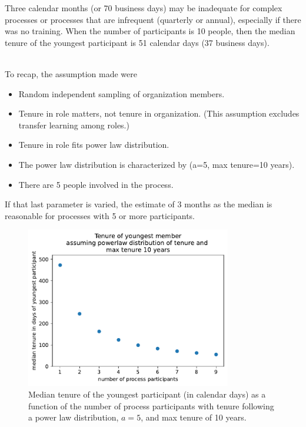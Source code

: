 Three calendar months (or 70 business days) may be inadequate for complex processes or processes that are infrequent (quarterly or annual), especially if there was no training. When the number of participants is 10 people, then the median tenure of the youngest participant is 51 calendar days (37 business days).

\ \\

To recap, the assumption made were
\begin{itemize}
    \item Random independent sampling of organization members. 
    \item Tenure in role matters, not tenure in organization. (This assumption excludes transfer learning among roles.)
    \item Tenure in role fits power law distribution.
    \item The power law distribution is characterized by (a=5, max tenure=10 years). 
    \item There are 5 people involved in the process.
\end{itemize}
If that last parameter is varied, the estimate of 3 months as the median  is reasonable for processes with 5 or more participants.

\begin{figure}[!htb]  %
    \centering
    \includegraphics[width=0.8\textwidth]{images/tenure_power_distribution_a5_with_max_tenure10.pdf}
    \caption{Median tenure of the youngest participant (in calendar days) as a function of the number of process participants with tenure following a power law distribution, $a=5$, and max tenure of 10 years.}
    \label{fig:tenure-powerlaw-5-participants}
\end{figure}


